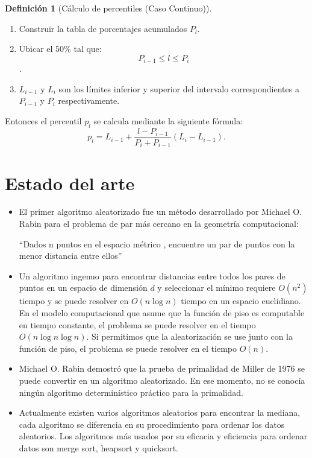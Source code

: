 \documentclass[final,a4paper,romanappendices]{IEEEtran}\usepackage[]{graphicx}\usepackage[]{color}
\theoremstyle{definition}
\newtheorem{definition}{Definición}[subsection]
\begin{document}
\begin{definition}[Cálculo de percentiles (Caso Continuo)]

\begin{enumerate}
	\item Construir la tabla de porcentajes acumulados $P_{l}$.
	\item	Ubicar el $50$\% tal que: $$ P_{i-1} \leq l\leq P_{i} $$.
	\item $L_{i-1}$ y $L_{i}$ son los límites inferior y superior del intervalo correspondientes a $P_{i-1}$ y $P_{i}$ respectivamente.
\end{enumerate}

Entonces el percentil $p_{l}$ se calcula mediante la siguiente fórmula: $$ p_{l} = L_{i-1} + \frac{l - P_{i-1}}{P_{i} + P_{i-1}} (L_{i} - L_{i-1}).$$
\end{definition}

\section{Estado del arte}

\begin{itemize}
  \item El primer algoritmo aleatorizado fue un método desarrollado por Michael O. Rabin para el problema de par más cercano en la geometría computacional:

{\centering
``Dados n puntos en el espacio métrico , encuentre un par de puntos con la menor distancia entre ellos''\par
}
  \item Un algoritmo ingenuo para encontrar distancias entre todos los pares de puntos en un espacio de dimensión $d$ y seleccionar el mínimo requiere $O(n^2)$ tiempo y se puede resolver en $O(n\log n)$ tiempo en un espacio euclidiano. En el modelo computacional que
asume que la función de piso es computable en tiempo constante, el problema se puede resolver en el tiempo $O(n\log n\log n)$. Si permitimos que la aleatorización se use junto con la función de piso, el problema se puede resolver en el tiempo $O(n)$.
  \item Michael O. Rabin demostró que la prueba de primalidad de Miller de 1976 se puede convertir en un algoritmo aleatorizado. En ese momento, no se conocía ningún algoritmo determinístico práctico para la primalidad.
  \item Actualmente existen varios algoritmos aleatorios para encontrar la mediana, cada algoritmo se diferencia en su procedimiento para ordenar los datos aleatorios. Los algoritmos más usados por su eficacia y eficiencia para ordenar datos son merge sort, heapsort y quicksort.
\end{itemize}
\end{document}

